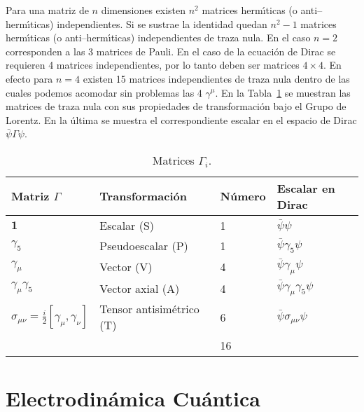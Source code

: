 Para una matriz de $n$ dimensiones existen $n^2$ matrices herm\'\i ticas (o anti--herm\'\i ticas) independientes. Si se sustrae la identidad quedan $n^2-1$ matrices herm\'\i ticas (o anti--herm\'\i ticas) independientes de traza nula. En el caso $n=2$ corresponden a las 3 matrices de Pauli. En el caso de la ecuaci\'on de Dirac se requieren 4 matrices independientes, por lo tanto deben ser matrices $4\times4$. En efecto para $n=4$ existen 15 matrices independientes de traza nula dentro de las cuales podemos acomodar sin problemas las 4 $\gamma^\mu$. En la Tabla~\ref{tab:Gamma} se muestran las matrices de traza nula con sus propiedades de transformaci\'on bajo el Grupo de Lorentz. En la \'ultima se muestra el correspondiente escalar en el espacio de Dirac $\bar\psi\Gamma\psi$.
\begin{table} %
  \centering %
  \begin{tabular}{l|l|l|l} %
Matriz $\Gamma$&Transformaci\'on&N\'umero&Escalar en Dirac\\\hline{}
$\mathbf{1}$&Escalar (S)&1&$\bar\psi\psi$\\
$\gamma_5$&Pseudoescalar (P)&1&$\bar\psi\gamma_5\psi$\\
$\gamma_\mu$&Vector (V)&4&$\bar\psi\gamma_\mu\psi$\\
$\gamma_\mu\gamma_5$ &Vector axial (A)&4&$\bar\psi\gamma_\mu\gamma_5\psi$\\
$\sigma_{\mu\nu}=\frac{i}{2}\left[\gamma_\mu,\gamma_\nu\right]$&Tensor antisim\'etrico (T)&6&$\bar\psi\sigma_{\mu\nu}\psi$\\\hline{}
&&16&\\
  \end{tabular} %
  \caption{Matrices $\Gamma_i$.} %
\label{tab:Gamma} %
\end{table} %

\section{Electrodin\'amica Cu\'antica}
\label{sec:electr-cuant}

